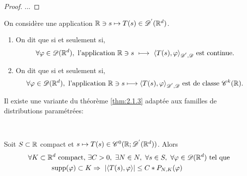\documentclass[french,a4paper,10pt]{article}
\begin{document}
            \begin{proof}
                ...
            \end{proof}

            \begin{definition}\label{2.2.3}
                On considère une application $\mathbb{R} \ni s \mapsto T(s)\in \mathscr{D^{'}}(\mathbb{R}^d)$.
                
                \begin{enumerate}
                    \item On dit que  si et seulement si,
                    \begin{equation*}
                        \begin{aligned}
                            \forall \varphi \in \mathscr{D}(\mathbb{R}^d), \text{ l'application } \mathbb{R} \ni s\ \longmapsto \ \langle T(s),\varphi \rangle_{\mathscr{D^{'}},\mathscr{D}} \text{ est continue.}
                        \end{aligned}
                    \end{equation*}

                    \item On dit que  si et seulement si,
                    \begin{equation*}
                        \begin{aligned}
                            \forall \varphi \in \mathscr{D}(\mathbb{R}^d), \text{ l'application } \mathbb{R} \ni s \longmapsto {\langle T(s),\varphi\rangle}_{\mathscr{D^{'}},\mathscr{D}} \text{ est de classe } \mathscr{C}^k(\mathbb{R}).
                        \end{aligned}
                    \end{equation*}
                \end{enumerate}
            \end{definition}

            Il existe une variante du théorème \ref{thm:2.1.3} adaptée aux familles de distributions paramétrées:
            
            \begin{theorem}\label{thm:2.2.4}~
            
                Soit $S \subset \mathbb{R}$ compact et $s \mapsto T(s) \in \mathscr{C}^0(\mathbb{R};\mathscr{D^{'}}(\mathbb{R}^d))$. Alors 
                \begin{equation*}
                    \begin{aligned}
                        \forall K \subset \R^d \text{ compact, } \exists &C>0, \ \exists N \in N, \ \forall s \in S,\ \forall \vphi \in \D(\R^d) \text{ tel que}\\
                        \text{supp}(\vphi) \subset K &\Rightarrow \ \n{\langle T(s),\vphi \rangle} \leq C*P_{N,K}(\vphi)
                    \end{aligned}
                \end{equation*}
            \end{theorem}
\end{document}
